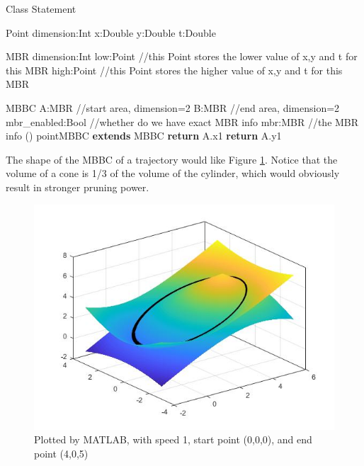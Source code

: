 \documentclass[sigplan]{acmart}
\begin{document}
\begin{algorithm}[ht]
\caption{Class Statement} \label{alg:class}



\begin{algorithmic}[0]
\Ensure Point
    \State dimension:Int
    \State x:Double
    \State y:Double
    \State t:Double

\Ensure MBR
    \State dimension:Int
    \State low:Point //this Point stores the lower value of x,y and t for this MBR
    \State high:Point //this Point stores the higher value of x,y and t for this MBR

\Ensure MBBC
    \State A:MBR //start area, dimension=2
    \State B:MBR //end area, dimension=2
    \State mbr\_enabled:Bool //whether do we have exact MBR info
    \State mbr:MBR //the MBR info
    ()
    \EndFunction
\Ensure pointMBBC \textbf{extends} MBBC
    \State \textbf{return} A.x1
    \EndFunction
    \State \textbf{return} A.y1
    \EndFunction
\end{algorithmic}
\end{algorithm}

The shape of the MBBC of a trajectory would like Figure \ref{fig:matlab}. Notice that the volume of a cone is 1/3 of the volume of the cylinder, which would obviously result in stronger pruning power.\\
\begin{figure}[ht]
  \centering
  \includegraphics[width=\linewidth]{matlab.jpg}
  \caption{Plotted by MATLAB, with speed 1, start point (0,0,0), and end point (4,0,5)}
  \label{fig:matlab}
\end{figure}
\end{document}
